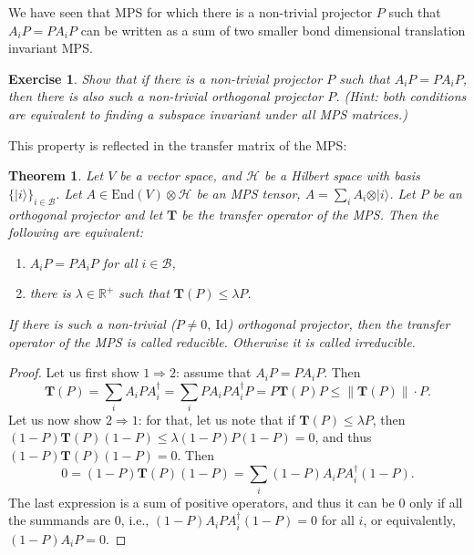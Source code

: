 \documentclass{article}
\newtheorem{theorem}{Theorem}
\newtheorem{exercise}{Exercise}
\newcommand{\id}{\mathrm{Id}}
\newcommand{\End}{\mathrm{End}}
\newcommand{\ket}[1]{\vert #1 \rangle}
\begin{document}
We have seen that MPS for which there is a non-trivial projector $P$ such that $A_iP = PA_iP$ can be written as a sum of two smaller bond dimensional translation invariant MPS. 
\begin{exercise}
  Show that if there is a non-trivial projector $P$ such that $A_iP = PA_iP$, then there is also such a non-trivial \emph{orthogonal} projector $P$. (Hint: both conditions are equivalent to finding a subspace invariant under all MPS matrices.)
\end{exercise}
This property is reflected in the transfer matrix of the MPS:
\begin{theorem}
  Let $V$ be a vector space, and $\mathcal{H}$ be a Hilbert space with basis $\{\ket{i}\}_{i\in \mathcal{B}}$. Let $A\in \End(V)\otimes \mathcal{H}$ be an MPS tensor, $A = \sum_i A_i \otimes \ket{i}$. Let $P$ be an orthogonal projector and let $\mathbf{T}$ be the transfer operator of the MPS. Then the following are equivalent:
  \begin{enumerate}
    \item  $A_i P = P A_i P$ for all $i\in \mathcal{B}$,
    \item there is $\lambda\in \mathbb{R}^+$ such that $\mathbf{T}(P)\leq \lambda P$.
  \end{enumerate}
  If there is such a non-trivial ($P\neq 0, \ \id$) orthogonal projector, then the transfer operator of the MPS is called \emph{reducible}. Otherwise it is called \emph{irreducible}.
\end{theorem}

\begin{proof}
  Let us first show $1\Rightarrow 2$: assume that $A_i P = P A_i P$. Then
  \begin{equation*}
    \mathbf{T}(P) = \sum_i A_i P A_i^\dagger = \sum_i PA_iPA_i^\dagger P = P\mathbf{T}(P)P \leq  \|\mathbf{T}(P)\| \cdot P.
  \end{equation*}
  Let us now show $2\Rightarrow 1$: for that, let us note that if $\mathbf{T}(P)\leq \lambda P$, then $(1-P) \mathbf{T}(P) (1-P) \leq \lambda (1-P)P(1-P) = 0$, and thus $(1-P) \mathbf{T}(P) (1-P) = 0$. Then
  \begin{equation*}
    0 = (1-P)\mathbf{T}(P)(1-P) = \sum_i (1-P)A_i P A_i^\dagger (1-P).
  \end{equation*} 
  The last expression is a sum of positive operators, and thus it can be $0$ only if all the summands are $0$, i.e., $(1-P)A_i P A_i^\dagger (1-P) = 0$  for all $i$, or equivalently, $(1-P)A_i P =0$. 
\end{proof}
\end{document}

